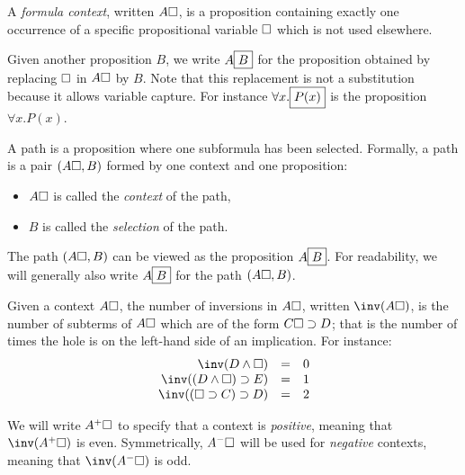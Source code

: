 \begin{definition}[Context]\label{def:formula-context}
  A \emph{formula context}, written $A\square$, is a proposition containing
  exactly one occurrence of a specific propositional variable $\square$ which is
  not used elsewhere.

  Given another proposition $B$, we write $A\fbox{$B$}$ for the
  proposition obtained by replacing $\square$ in $A\square$ by $B$. Note
  that this replacement is not a substitution because it allows variable
  capture. For instance $\forall x.\fbox{$P(x)$}$ is the proposition
  $\forall x.P(x)$.
\end{definition}

\begin{definition}[Path]\label{def:path}
A path is a proposition where one subformula has been
selected. Formally, a path is a pair $(A\square, B)$ formed by one
context and one proposition:
\begin{itemize}
\item $A\square$ is called the {\em context} of the path,
\item $B$ is called the {\em selection} of the path.
\end{itemize}

The path $(A\square, B)$ can be viewed as the proposition
$A\fbox{$B$}$.  For readability, we will generally also write
$A\fbox{$B$}$ for the path $(A\square, B)$.
\end{definition}

\begin{definition}[Inversions]
  Given a context $A\square$, the number of inversions in $A\square$,
  written $\inv(A\hole)$, is the number of subterms of $A\square$
  which are of the form $C\square\supset D$; that is the number of
  times the hole is on the left-hand side of an implication.
  For instance:
  $$
  \begin{array}{rcl}
      \inv(D\land \hole)&=& 0\\
      \inv((D\land \hole)\limp E)&=&1\\
      \inv((\hole\limp C)\limp D) &=& 2
  \end{array}
  $$
\end{definition}

\begin{definition}[Polarity]\label{def:polarity}
We will write $A^+\square$ to specify that a context is {\em positive},
meaning that $\inv(A^+\hole)$ is even. Symmetrically, $A^-\square$ will be
used for {\em negative} contexts, meaning that $\inv(A^-\hole)$ is odd.
\end{definition}

